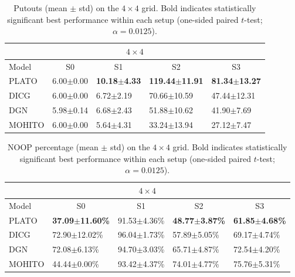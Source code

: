 \begin{table}[t]
\centering
\small
\setlength{\tabcolsep}{2.5pt}
\renewcommand{\arraystretch}{1.03}
\begin{tabular}{l|l|l|l|l}
\toprule
\multicolumn{5}{c}{$4\times 4$} \\
\midrule
Model & \multicolumn{1}{c|}{S0} & \multicolumn{1}{c|}{S1} & \multicolumn{1}{c|}{S2} & \multicolumn{1}{c}{S3} \\
\midrule
PLATO & 6.00$\pm$0.00 & \textbf{10.18$\pm$4.33} & \textbf{119.44$\pm$11.91} & \textbf{81.34$\pm$13.27} \\
DICG & 6.00$\pm$0.00 & 6.72$\pm$2.19 & 70.66$\pm$10.59 & 47.44$\pm$12.31 \\
DGN & 5.98$\pm$0.14 & 6.68$\pm$2.43 & 51.88$\pm$10.62 & 41.90$\pm$7.69 \\
MOHITO  & 6.00$\pm$0.00 & 5.64$\pm$4.31 & 33.24$\pm$13.94 & 27.12$\pm$7.47 \\
\bottomrule
\end{tabular}
\caption{Putouts (mean $\pm$ std) on the $4\times 4$ grid. Bold indicates statistically significant best performance within each setup (one-sided paired $t$-test; $\alpha=0.0125$).}
\label{tab:putouts_4x4}
\end{table}


\begin{table}[t]
\centering
\small
\setlength{\tabcolsep}{2.5pt}
\renewcommand{\arraystretch}{1.03}
\begin{tabular}{l|l|l|l|l}
\toprule
\multicolumn{5}{c}{$4\times 4$} \\
\midrule
Model & \multicolumn{1}{c|}{S0} & \multicolumn{1}{c|}{S1} & \multicolumn{1}{c|}{S2} & \multicolumn{1}{c}{S3} \\
\midrule
PLATO & \textbf{37.09$\pm$11.60\%} & 91.53$\pm$4.36\% & \textbf{48.77$\pm$3.87\%} & \textbf{61.85$\pm$4.68\%} \\
DICG & 72.90$\pm$12.02\% & 96.04$\pm$1.73\% & 57.89$\pm$5.05\% & 69.17$\pm$4.74\% \\
DGN & 72.08$\pm$6.13\% & 94.70$\pm$3.03\% & 65.71$\pm$4.87\% & 72.54$\pm$4.20\% \\
MOHITO  & 44.44$\pm$0.00\% & 93.42$\pm$4.37\% & 74.01$\pm$4.77\% & 75.76$\pm$5.31\% \\
\bottomrule
\end{tabular}
\caption{NOOP percentage (mean $\pm$ std) on the $4\times 4$ grid. Bold indicates statistically significant best performance within each setup (one-sided paired $t$-test; $\alpha=0.0125$).}
\label{tab:noop_4x4}
\end{table}




